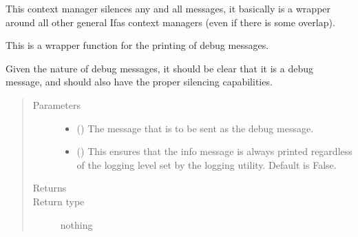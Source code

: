 \documentclass[letterpaper,10pt,english]{sphinxmanual}
\begin{document}

\begin{fulllineitems}
\label{\detokenize{docstrings/ifa_smeargle.core.error:ifa_smeargle.core.error.ifas_absolute_silence}}
This context manager silences any and all messages, it
basically is a wrapper around all other general Ifas context
managers (even if there is some overlap).

\end{fulllineitems}


\begin{fulllineitems}
\label{\detokenize{docstrings/ifa_smeargle.core.error:ifa_smeargle.core.error.ifas_debug}}
This is a wrapper function for the printing of debug messages.

Given the nature of debug messages, it should be clear that it
is a debug message, and should also have the proper silencing
capabilities.
\begin{quote}\begin{description}
\item[{Parameters}] \leavevmode\begin{itemize}
\item {} 
 () \textendash{} The message that is to be sent as the debug message.

\item {} 
 (\sphinxstyleliteralemphasis{\sphinxupquote{ (}}\sphinxstyleliteralemphasis{\sphinxupquote{)}}) \textendash{} This ensures that the info message is always printed
regardless of the logging level set by the logging utility.
Default is False.

\end{itemize}

\item[{Returns}] \leavevmode


\item[{Return type}] \leavevmode
nothing

\end{description}\end{quote}

\end{fulllineitems}
\end{document}
